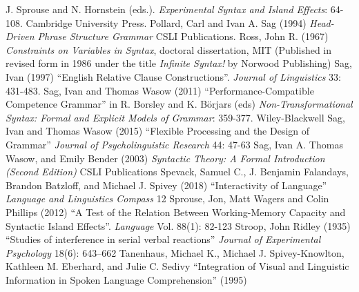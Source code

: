\documentclass[a4paper]{article}
\begin{document}
J. Sprouse and N. Hornstein (eds.).
{\it Experimental Syntax
and Island Effects}: 64-108.
Cambridge University
Press.
\newline
\newline
Pollard, Carl and Ivan A. Sag (1994) {\it Head-Driven Phrase Structure Grammar}  CSLI Publications.
\newline
\newline
Ross, John R. (1967) {\it Constraints on Variables in Syntax}, doctoral dissertation, MIT  (Published in revised form in 1986 under the title {\it Infinite Syntax!} by Norwood Publishing)
\newline
\newline
Sag, Ivan (1997) ``English Relative Clause Constructions''.  {\it Journal of
Linguistics}
33:  
431-483.
\newline
\newline
Sag, Ivan and Thomas Wasow (2011) ``Performance-Compatible Competence Grammar'' in R. Borsley and K. Börjars (eds) {\it Non-Transformational Syntax: Formal and Explicit Models of Grammar}: 359-377. Wiley-Blackwell
\newline
\newline
Sag, Ivan and Thomas Wasow (2015) ``Flexible Processing and the Design of Grammar'' {\it Journal of Psycholinguistic Research} 44: 47-63
\newline
\newline
Sag, Ivan A. Thomas Wasow, and Emily Bender (2003) {\it Syntactic Theory: A Formal Introduction (Second Edition)} CSLI Publications
\newline
\newline
Spevack, Samuel C., 
J. Benjamin Falandays,
Brandon Batzloff, and
Michael J. Spivey (2018) ``Interactivity of Language'' {\it Language and Linguistics Compass} 12
\newline
\newline
Sprouse, Jon, Matt Wagers and Colin Phillips (2012) ``A Test of the Relation Between Working-Memory Capacity and Syntactic Island Effects''.  {\it Language}  Vol. 88(1): 82-123
\newline
\newline
Stroop, John Ridley (1935) ``Studies of interference in serial verbal reactions'' {\it Journal of Experimental Psychology} 18(6): 643–662
\newline
\newline
Tanenhaus, Michael K., Michael J. Spivey-Knowlton, Kathleen M. Eberhard, and Julie C. Sedivy
``Integration of Visual and Linguistic Information in Spoken Language Comprehension''  (1995)
\end{document}
